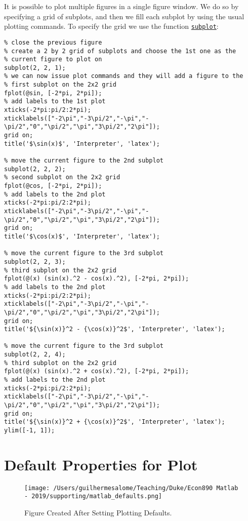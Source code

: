 \documentclass[12pt, a4paper]{article}
\begin{document}
It is possible to plot multiple figures in a single figure window.
We do so by specifying a grid of subplots, and then we fill each subplot by using the usual plotting commands.
To specify the grid we use the function \href{https://www.mathworks.com/help/matlab/ref/subplot.html?s\_tid=doc\_ta}{\texttt{subplot}}:
\lstset{language=matlab,label= ,caption= ,captionpos=b,firstnumber=1,numbers=left,style=Matlab-editor}
\begin{lstlisting}
% close the previous figure
% create a 2 by 2 grid of subplots and choose the 1st one as the
% current figure to plot on
subplot(2, 2, 1);
% we can now issue plot commands and they will add a figure to the
% first subplot on the 2x2 grid
fplot(@sin, [-2*pi, 2*pi]);
% add labels to the 1st plot
xticks(-2*pi:pi/2:2*pi);
xticklabels(["-2\pi","-3\pi/2","-\pi","-\pi/2","0","\pi/2","\pi","3\pi/2","2\pi"]);
grid on;
title('$\sin(x)$', 'Interpreter', 'latex');

% move the current figure to the 2nd subplot
subplot(2, 2, 2);
% second subplot on the 2x2 grid
fplot(@cos, [-2*pi, 2*pi]);
% add labels to the 2nd plot
xticks(-2*pi:pi/2:2*pi);
xticklabels(["-2\pi","-3\pi/2","-\pi","-\pi/2","0","\pi/2","\pi","3\pi/2","2\pi"]);
grid on;
title('$\cos(x)$', 'Interpreter', 'latex');

% move the current figure to the 3rd subplot
subplot(2, 2, 3);
% third subplot on the 2x2 grid
fplot(@(x) (sin(x).^2 - cos(x).^2), [-2*pi, 2*pi]);
% add labels to the 2nd plot
xticks(-2*pi:pi/2:2*pi);
xticklabels(["-2\pi","-3\pi/2","-\pi","-\pi/2","0","\pi/2","\pi","3\pi/2","2\pi"]);
grid on;
title('${\sin(x)}^2 - {\cos(x)}^2$', 'Interpreter', 'latex');

% move the current figure to the 3rd subplot
subplot(2, 2, 4);
% third subplot on the 2x2 grid
fplot(@(x) (sin(x).^2 + cos(x).^2), [-2*pi, 2*pi]);
% add labels to the 2nd plot
xticks(-2*pi:pi/2:2*pi);
xticklabels(["-2\pi","-3\pi/2","-\pi","-\pi/2","0","\pi/2","\pi","3\pi/2","2\pi"]);
grid on;
title('${\sin(x)}^2 + {\cos(x)}^2$', 'Interpreter', 'latex');
ylim([-1, 1]);
\end{lstlisting}
\section{Default Properties for Plot}
\label{sec:org154891c}
\begin{figure}[H]
\centering
\texttt{[image: /Users/guilhermesalome/Teaching/Duke/Econ890 Matlab - 2019/supporting/matlab\_defaults.png]}
\caption{\label{fig:org9d9850b}
Figure Created After Setting Plotting Defaults.}
\end{figure}
\end{document}
